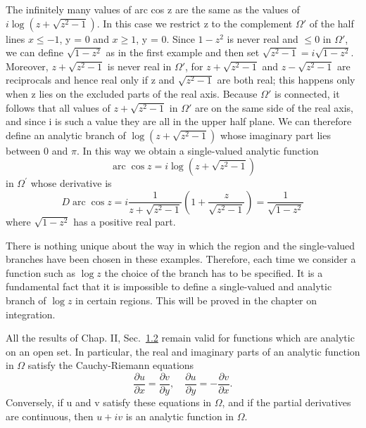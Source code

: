 The infinitely many values of arc cos z are the same as the values of $i \log (z + \sqrt{z^{2} - 1})$. In this case we restrict z to the complement $\Omega'$ of the half lines $x \leq -1$, y = 0 and $x \geq 1$, y = 0. Since $1 - z^{2}$ is never real and $\leq 0$ in $\Omega'$, we can define $\sqrt{1 - z^{2}}$ as in the first example and then set $\sqrt{z^{2} - 1} = i\sqrt{1 - z^{2}}$. Moreover, $z + \sqrt{z^{2} - 1}$ is never real in $\Omega'$, for $z + \sqrt{z^{2} - 1}$ and $z - \sqrt{z^{2} - 1}$ are reciprocals and hence real only if z and $\sqrt{z^{2} - 1}$ are both real; this happens only when z lies on the excluded parts of the real axis. Because $\Omega'$ is connected, it follows that all values of $z + \sqrt{z^{2} - 1}$ in $\Omega'$ are on the same side of the real axis, and since i is such a value they are all in the upper half plane. We can therefore define an analytic branch of $\log (z + \sqrt{z^{2} - 1})$ whose imaginary part lies between 0 and $\pi$. In this way we obtain a single-valued analytic function
\begin{equation*}
\operatorname{arc} \cos z = i \log (z + \sqrt {z ^ {2} - 1})
\end{equation*}
in $\Omega^{\prime}$ whose derivative is
\begin{equation*}
D \operatorname{arc} \cos z = i \frac {1}{z + \sqrt {z ^ {2} - 1}} \left(1 + \frac {z}{\sqrt {z ^ {2} - 1}}\right) = \frac {1}{\sqrt {1 - z ^ {2}}}
\end{equation*}
where $\sqrt{1 - z^2}$ has a positive real part.

There is nothing unique about the way in which the region and the single-valued branches have been chosen in these examples. Therefore, each time we consider a function such as $\log z$ the choice of the branch has to be specified. It is a fundamental fact that it is impossible to define a single-valued and analytic branch of $\log z$ in certain regions. This will be proved in the chapter on integration.

All the results of Chap. II, Sec.~\hyperref[sec:3.1.2]{1.2} remain valid for functions which are analytic on an open set. In particular, the real and imaginary parts of an analytic function in $\Omega$ satisfy the Cauchy-Riemann equations
\begin{equation*}
\frac {\partial u}{\partial x} = \frac {\partial v}{\partial y}, \quad \frac {\partial u}{\partial y} = - \frac {\partial v}{\partial x}.
\end{equation*}
Conversely, if u and v satisfy these equations in $\Omega$, and if the partial derivatives are continuous, then $u + iv$ is an analytic function in $\Omega$.

